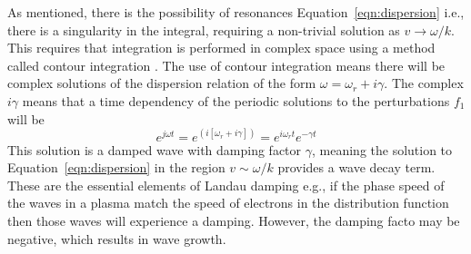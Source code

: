 As mentioned, there is the possibility of resonances Equation~\ref{eqn:dispersion} i.e., there is a singularity in the integral, requiring a non-trivial solution as $v \rightarrow \omega/k$. This requires that integration is performed in complex space using a method called contour integration \citep{melrose1989}. The use of contour integration means there will be complex solutions of the dispersion relation of the form $\omega = \omega_r + i\gamma$.
The complex $i\gamma$ means that a time dependency of the periodic solutions to the perturbations $f_1$ will be 
\begin{equation}
e^{j\omega t}=e^{(i[\omega_r + i\gamma])}=e^{i\omega_rt}e^{-\gamma t}
\label{eqn:growth}
\end{equation}
This solution is a damped wave with damping factor $\gamma$, meaning the solution to Equation~\ref{eqn:dispersion} in the region $v \sim \omega/k$ provides a wave decay term. These are the essential elements of Landau damping e.g., if the phase speed of the waves in a plasma match the speed of electrons in the distribution function then those waves will experience a damping. However, the damping facto may be negative, which results in wave growth.

